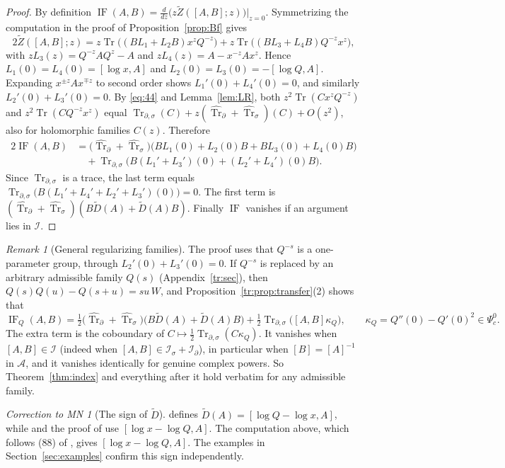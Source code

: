 \documentclass[11pt,oneside,reqno]{article}
\DeclareMathOperator{\Tr}{Tr}
\DeclareMathOperator{\IF}{IF}
\newcommand{\cA}{\mathcal A}
\newcommand{\cI}{\mathcal I}
\newcommand{\Is}{\mathcal I_\sigma}
\newcommand{\Id}{\mathcal I_\partial}
\newcommand{\Psic}{\Psi_{c}}
\newcommand{\Trds}{\Tr_{\partial,\sigma}}
\newcommand{\hTrs}{\widehat{\Tr}_\sigma}
\newcommand{\hTrd}{\widehat{\Tr}_\partial}
\newcommand{\lQ}{\log Q}
\newcommand{\lx}{\log x}
\theoremstyle{plain}
\theoremstyle{definition}
\theoremstyle{remark}
\newtheorem{remark}[theorem]{Remark}
\newtheorem{correction}[theorem]{Correction to MN}
\begin{document}
\begin{proof}
By definition \(\IF(A,B)=\frac{d}{dz}\bigl(z\widetilde Z([A,B];z)\bigr)
|_{z=0}\). Symmetrizing the computation in the proof of
Proposition~\ref{prop:Bf} gives \cite[(88)]{MN}
\[
 2\widetilde Z([A,B];z)=z\Tr\bigl((BL_1+L_2B)x^zQ^{-z}\bigr)+
 z\Tr\bigl((BL_3+L_4B)Q^{-z}x^z\bigr),
\]
with \(zL_3(z)=Q^{-z}AQ^z-A\) and \(zL_4(z)=A-x^{-z}Ax^z\). Hence
\(L_1(0)=L_4(0)=[\lx,A]\) and \(L_2(0)=L_3(0)=-[\lQ,A]\). Expanding
\(x^{\pm z}Ax^{\mp z}\) to second order shows
\(L_1'(0)+L_4'(0)=0\), and similarly \(L_2'(0)+L_3'(0)=0\). By
\eqref{eq:44} and Lemma~\ref{lem:LR}, both \(z^2\Tr(Cx^zQ^{-z})\) and
\(z^2\Tr(CQ^{-z}x^z)\) equal \(\Trds(C)+z(\hTrd+\hTrs)(C)+O(z^2)\), also
for holomorphic families \(C(z)\). Therefore
\begin{align*}
 2\IF(A,B)&=\bigl(\hTrd+\hTrs\bigr)\bigl(BL_1(0)+L_2(0)B+BL_3(0)+L_4(0)B\bigr)\\
 &\quad+\Trds\bigl(B(L_1'+L_3')(0)+(L_2'+L_4')(0)B\bigr).
\end{align*}
Since \(\Trds\) is a trace, the last term equals
\(\Trds\bigl(B(L_1'+L_4'+L_2'+L_3')(0)\bigr)=0\). The first term is
\((\hTrd+\hTrs)(B\widetilde D(A)+\widetilde D(A)B)\). Finally \(\IF\)
vanishes if an argument lies in \(\cI\).
\end{proof}

\begin{remark}[General regularizing families]\label{rem:IFkappa}
The proof uses that \(Q^{-s}\) is a one-parameter group, through
\(L_2'(0)+L_3'(0)=0\). If \(Q^{-s}\) is replaced by an arbitrary admissible
family \(Q(s)\) (Appendix~\ref{tr:sec}), then \(Q(s)Q(u)-Q(s+u)=su\,W\),
and Proposition~\ref{tr:prop:transfer}(2) shows that
\[
 \IF_Q(A,B)=\tfrac12\bigl(\hTrd+\hTrs\bigr)\bigl(B\widetilde D(A)+
 \widetilde D(A)B\bigr)+\tfrac12\Trds\bigl([A,B]\kappa_Q\bigr),\qquad
 \kappa_Q=Q''(0)-Q'(0)^2\in\Psic^0 .
\]
The extra term is the coboundary of \(C\mapsto\frac12\Trds(C\kappa_Q)\). It
vanishes when \([A,B]\in\cI\) (indeed when \([A,B]\in\Is+\Id\)), in
particular when \([B]=[A]^{-1}\) in \(\cA\), and it vanishes identically
for genuine complex powers. So Theorem~\ref{thm:index} and everything
after it hold verbatim for any admissible family.
\end{remark}

\begin{correction}[The sign of \(\widetilde D\)]\label{corr:Dtilde}
\cite[(21)]{MN} defines \(\widetilde D(A)=[\lQ-\lx,A]\), while
\cite[(83)]{MN} and the proof of \cite[Prop.~16]{MN} use
\([\lx-\lQ,A]\). The computation above, which follows (88) of \cite{MN},
gives \([\lx-\lQ,A]\). The examples in Section~\ref{sec:examples} confirm
this sign independently.
\end{correction}
\end{document}
